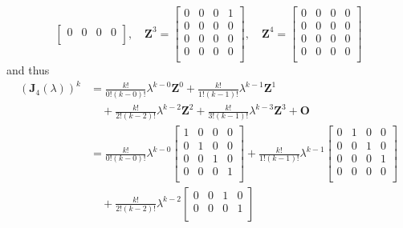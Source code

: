 \documentclass[12pt,a4paper]{article}
\begin{document}
\begin{itemize}
\begin{itemize}
\begin{equation}
\begin{bmatrix}
        0 & 0 & 0 & 0 \\
      \end{bmatrix},
      \quad
      \bm{Z}^{3} =
      \begin{bmatrix}
        0 & 0 & 0 & 1 \\
        0 & 0 & 0 & 0 \\
        0 & 0 & 0 & 0 \\
        0 & 0 & 0 & 0 \\
      \end{bmatrix},
      \quad
      \bm{Z}^{4} =
      \begin{bmatrix}
        0 & 0 & 0 & 0 \\
        0 & 0 & 0 & 0 \\
        0 & 0 & 0 & 0 \\
        0 & 0 & 0 & 0 \\
      \end{bmatrix}
    \end{equation}
    and thus
    \begin{align}
      (\bm{J}_{4}(\lambda))^{k}
        & = \frac{k!}{0!(k-0)!}\lambda^{k-0}\bm{Z}^{0} + \frac{k!}{1!(k-1)!}\lambda^{k-1}\bm{Z}^{1} \nonumber \\
        & \quad + \frac{k!}{2!(k-2)!}\lambda^{k-2}\bm{Z}^{2} +  \frac{k!}{3!(k-1)!}\lambda^{k-3}\bm{Z}^{3} + \bm{O}  \nonumber \\
        & = \frac{k!}{0!(k-0)!}\lambda^{k-0}
          \begin{bmatrix}
            1 & 0 & 0 & 0 \\
            0 & 1 & 0 & 0 \\
            0 & 0 & 1 & 0 \\
            0 & 0 & 0 & 1 \\
          \end{bmatrix}
          + \frac{k!}{1!(k-1)!}\lambda^{k-1}
          \begin{bmatrix}
            0 & 1 & 0 & 0 \\
            0 & 0 & 1 & 0 \\
            0 & 0 & 0 & 1 \\
            0 & 0 & 0 & 0 \\
          \end{bmatrix}
          \nonumber \\
        & \quad + \frac{k!}{2!(k-2)!}\lambda^{k-2}
          \begin{bmatrix}
            0 & 0 & 1 & 0 \\
            0 & 0 & 0 & 1 \\

\end{bmatrix}
\end{align}
\end{itemize}
\end{itemize}
\end{document}
